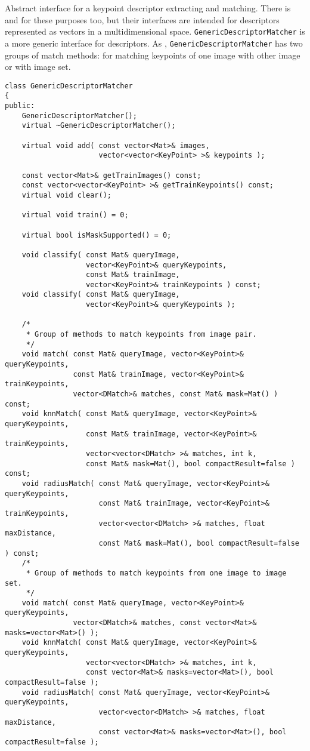 Abstract interface for a keypoint descriptor extracting and matching. 
There is  and  
for these purposes too, but their interfaces are intended for descriptors 
represented as vectors in a multidimensional space. \texttt{GenericDescriptorMatcher} 
is a more generic interface for descriptors.
As , \texttt{GenericDescriptorMatcher} has two groups 
of match methods: for matching keypoints of one image with other image or
with image set.
 
\begin{lstlisting}
class GenericDescriptorMatcher
{
public:
    GenericDescriptorMatcher();
    virtual ~GenericDescriptorMatcher();

    virtual void add( const vector<Mat>& images,
                      vector<vector<KeyPoint> >& keypoints );

    const vector<Mat>& getTrainImages() const;
    const vector<vector<KeyPoint> >& getTrainKeypoints() const;
    virtual void clear();

    virtual void train() = 0;

    virtual bool isMaskSupported() = 0;

    void classify( const Mat& queryImage, 
                   vector<KeyPoint>& queryKeypoints,
                   const Mat& trainImage, 
                   vector<KeyPoint>& trainKeypoints ) const;
    void classify( const Mat& queryImage, 
                   vector<KeyPoint>& queryKeypoints );

    /*
     * Group of methods to match keypoints from image pair.
     */
    void match( const Mat& queryImage, vector<KeyPoint>& queryKeypoints,
                const Mat& trainImage, vector<KeyPoint>& trainKeypoints,
                vector<DMatch>& matches, const Mat& mask=Mat() ) const;
    void knnMatch( const Mat& queryImage, vector<KeyPoint>& queryKeypoints,
                   const Mat& trainImage, vector<KeyPoint>& trainKeypoints,
                   vector<vector<DMatch> >& matches, int k, 
                   const Mat& mask=Mat(), bool compactResult=false ) const;
    void radiusMatch( const Mat& queryImage, vector<KeyPoint>& queryKeypoints,
                      const Mat& trainImage, vector<KeyPoint>& trainKeypoints,
                      vector<vector<DMatch> >& matches, float maxDistance, 
                      const Mat& mask=Mat(), bool compactResult=false ) const;
    /*
     * Group of methods to match keypoints from one image to image set.
     */
    void match( const Mat& queryImage, vector<KeyPoint>& queryKeypoints,
                vector<DMatch>& matches, const vector<Mat>& masks=vector<Mat>() );
    void knnMatch( const Mat& queryImage, vector<KeyPoint>& queryKeypoints,
                   vector<vector<DMatch> >& matches, int k, 
                   const vector<Mat>& masks=vector<Mat>(), bool compactResult=false );
    void radiusMatch( const Mat& queryImage, vector<KeyPoint>& queryKeypoints,
                      vector<vector<DMatch> >& matches, float maxDistance, 
                      const vector<Mat>& masks=vector<Mat>(), bool compactResult=false );


\end{lstlisting}
